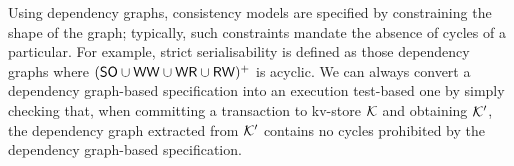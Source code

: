 Using dependency graphs, consistency models are specified by constraining the shape of the graph; typically, such constraints mandate the absence of cycles of a particular. For example, strict serialisability is defined as those dependency graphs where $(\mathsf{SO} \cup \mathsf{WW} \cup \mathsf{WR} \cup \mathsf{RW})^+$ is acyclic. 
We can always convert a dependency graph-based specification into an execution test-based one by simply checking that, when committing a transaction to kv-store $\mathcal{K}$ and obtaining $\mathcal{K}'$, 
the dependency graph extracted from $\mathcal{K}'$ contains no cycles prohibited by the dependency graph-based specification. 



